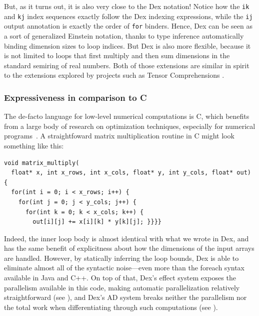 \documentclass[acmsmall,screen,nonacm]{acmart}
\newlength{\codeindent}
\begin{document}
But, as it turns out, it is also very close to the Dex notation!
Notice how the \texttt{ik} and \texttt{kj} index sequences exactly follow the Dex indexing expressions, while the \texttt{ij} output annotation is exactly the order of \texttt{for} binders.
Hence, Dex can be seen as a sort of generalized Einstein notation, thanks to type inference automatically binding dimension sizes to loop indices.
But Dex is also more flexible, because it is not limited to loops that first multiply and then sum dimensions in the standard semiring of real numbers.
Both of those extensions are similar in spirit to the extensions explored by projects such as Tensor Comprehensions \citep{vasilache2018tensor}.

\subsubsection{Expressiveness in comparison to C}
\label{sec:compare-c++}
The de-facto language for low-level numerical computations is C, which benefits from a large body of research on optimization techniques, especially for numerical programs~\citep{grosser2012polly, pluto}.
A straightfoward matrix multiplication routine in C might look something like this:
\begin{Verbatim}[xleftmargin=\codeindent,fontsize=\small]
void matrix_multiply(
  float* x, int x_rows, int x_cols, float* y, int y_cols, float* out) {
  for(int i = 0; i < x_rows; i++) {
    for(int j = 0; j < y_cols; j++) {
      for(int k = 0; k < x_cols; k++) {
        out[i][j] += x[i][k] * y[k][j]; }}}}
\end{Verbatim}

Indeed, the inner loop body is almost identical with what we wrote in Dex, and has the same benefit of explicitness about how the dimensions of the input arrays are handled.
However, by statically inferring the loop bounds, Dex is able to eliminate almost all of the syntactic noise---even more than the foreach syntax available in Java and C++.
On top of that, Dex's effect system exposes the parallelism available in this code, making automatic parallelization relatively straightforward (see ), and Dex's AD system breaks neither the parallelism nor the total work when differentiating through such computations (see ).
\end{document}
